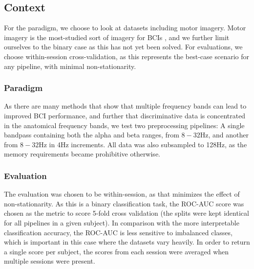 \subsection{Context}
For the paradigm, we choose to look at datasets including motor
imagery.  Motor imagery is the most-studied sort of imagery for BCIs
\cite{Yuan2014}, and we further limit ourselves to the binary case as
this has not yet been solved. For evaluations, we choose
within-session cross-validation, as this represents the best-case
scenario for any pipeline, with minimal non-stationarity. 

\subsubsection{Paradigm}

As there are many methods that show that multiple frequency bands can lead to
improved BCI performance\cite{KaiKengAng2008}, and further that discriminative
data is concentrated in the anatomical frequency bands, we test two
preprocessing pipelines: A single bandpass containing both the alpha and beta
ranges, from $8-32\text{Hz}$, and another from $8-32\text{Hz}$ in 4Hz
increments. All data was also subsampled to 128Hz, as the memory requirements
became prohibitive otherwise.

\subsubsection{Evaluation}
The evaluation was chosen to be within-session, as that minimizes the effect of
non-stationarity. As this is a binary classification task, the ROC-AUC score was
chosen as the metric to score 5-fold cross validation (the splits were kept
identical for all pipelines in a given subject). In comparison with the more
interpretable classification accuracy, the ROC-AUC is less sensitive to
imbalanced classes, which is important in this case where the datasets vary
heavily. In order to return a single score per subject, the scores from each
session were averaged when multiple sessions were present.

